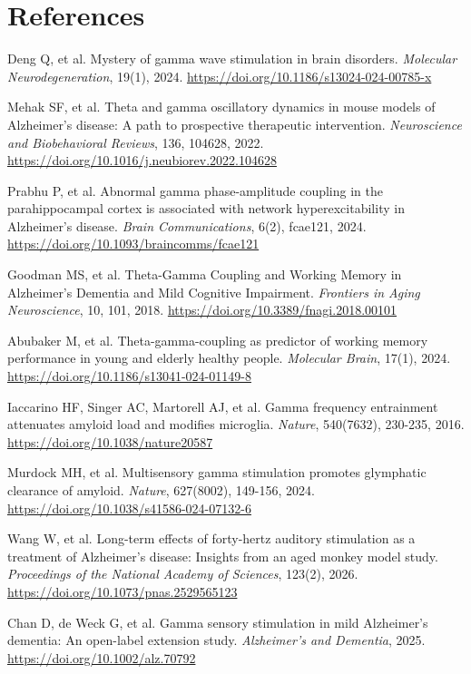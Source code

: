 \documentclass[11pt,letterpaper]{article}
\begin{document}
\section*{References}
\begin{enumerate}[label={[\arabic*]}, leftmargin=2em, itemsep=2pt, parsep=0pt]
\item Deng Q, et al. Mystery of gamma wave stimulation in brain disorders. \textit{Molecular Neurodegeneration}, 19(1), 2024. \url{https://doi.org/10.1186/s13024-024-00785-x}
\item Mehak SF, et al. Theta and gamma oscillatory dynamics in mouse models of Alzheimer's disease: A path to prospective therapeutic intervention. \textit{Neuroscience and Biobehavioral Reviews}, 136, 104628, 2022. \url{https://doi.org/10.1016/j.neubiorev.2022.104628}
\item Prabhu P, et al. Abnormal gamma phase-amplitude coupling in the parahippocampal cortex is associated with network hyperexcitability in Alzheimer's disease. \textit{Brain Communications}, 6(2), fcae121, 2024. \url{https://doi.org/10.1093/braincomms/fcae121}
\item Goodman MS, et al. Theta-Gamma Coupling and Working Memory in Alzheimer's Dementia and Mild Cognitive Impairment. \textit{Frontiers in Aging Neuroscience}, 10, 101, 2018. \url{https://doi.org/10.3389/fnagi.2018.00101}
\item Abubaker M, et al. Theta-gamma-coupling as predictor of working memory performance in young and elderly healthy people. \textit{Molecular Brain}, 17(1), 2024. \url{https://doi.org/10.1186/s13041-024-01149-8}
\item Iaccarino HF, Singer AC, Martorell AJ, et al. Gamma frequency entrainment attenuates amyloid load and modifies microglia. \textit{Nature}, 540(7632), 230-235, 2016. \url{https://doi.org/10.1038/nature20587}
\item Murdock MH, et al. Multisensory gamma stimulation promotes glymphatic clearance of amyloid. \textit{Nature}, 627(8002), 149-156, 2024. \url{https://doi.org/10.1038/s41586-024-07132-6}
\item Wang W, et al. Long-term effects of forty-hertz auditory stimulation as a treatment of Alzheimer's disease: Insights from an aged monkey model study. \textit{Proceedings of the National Academy of Sciences}, 123(2), 2026. \url{https://doi.org/10.1073/pnas.2529565123}
\item Chan D, de Weck G, et al. Gamma sensory stimulation in mild Alzheimer's dementia: An open-label extension study. \textit{Alzheimer's and Dementia}, 2025. \url{https://doi.org/10.1002/alz.70792}

\end{enumerate}
\end{document}
